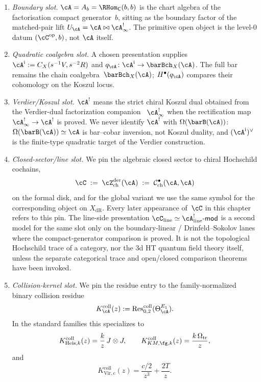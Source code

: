 \begin{enumerate}[label=\textup{(\arabic*)}]
\item \emph{Boundary slot.} $\cA=A_b=\RHom_{\mathsf C}(b,b)$ is the
 chart algebra of the factorisation compact generator~$b$, sitting as the boundary factor of
 the matched-pair lift $U_\cA = \cA\bowtie\cA^{!}_\infty$. The
 primitive open object is the level-$0$ datum
 $(\cC^{\mathrm{op}},b)$, not $\cA$ itself.
\item \emph{Quadratic coalgebra slot.}
 A chosen presentation supplies
 $\cA^{\mathrm i}:=C_X(s^{-1}V,s^{-2}R)$ and
 $q_\cA\colon\cA^{\mathrm i}\to\barBch_X(\cA)$.
 The full bar remains the chain coalgebra~$\barBch_X(\cA)$;
 $H^\bullet(q_\cA)$ compares their cohomology on the Koszul locus.
\item \emph{Verdier/Koszul slot.} $\cA^!$ means the strict chiral
 Koszul dual obtained from the Verdier-dual factorization companion
~$\cA^{!}_\infty$ when the rectification map
 $\cA^{!}_\infty \to \cA^!$ is proved. We never identify
 $\cA^!$ with $\Omega(\barB(\cA))$: $\Omega(\barB(\cA))\simeq \cA$ is
 bar--cobar inversion, not Koszul duality, and
 $(\cA^{\mathrm i})^\vee$ is the finite-type quadratic target of the Verdier
 construction.
\item \emph{Closed-sector/line slot.} We pin the algebraic closed sector to chiral
 Hochschild cochains,
 \[
 \cC \;:=\; \cZ^{\mathrm{der}}_{\mathrm{ch}}(\cA)
 \;:=\; \mathcal{C}^{\bullet}_{\mathrm{ch}}(\cA,\cA)
 \]
 on the formal disk, and for the global variant we use the same symbol
 for the corresponding object on $X_{\mathrm{dR}}$. Every later
 appearance of~$\cC$ in this chapter refers to this pin. The line-side
 presentation $\cC_{\mathrm{line}} \simeq
 \cA^!_{\mathrm{line}}\text{-}\mathsf{mod}$ is a second model for the
 same slot only on the boundary-linear / Drinfeld--Sokolov lanes where
 the compact-generator comparison is proved. It is not the
 topological Hochschild trace of a category, nor the $3$d HT quantum
 field theory itself, unless the separate categorical trace and
 open/closed comparison theorems have been invoked.
\item \emph{Collision-kernel slot.} We pin the residue entry to the
 family-normalized binary collision residue
 \[
 K_\cA^{\mathrm{coll}}(z)
 :=\operatorname{Res}^{\mathrm{coll}}_{0,2}(\Theta_\cA^{E_1}).
 \]
 In the standard families this specializes to
 \[
 K^{\mathrm{coll}}_{\mathrm{Heis},k}(z)=\frac{k}{z}\,J\otimes J,
 \qquad
 K^{\mathrm{coll}}_{KM,\fg,k}(z)=\frac{k\,\Omega_{\mathrm{tr}}}{z},
 \]
 and
 \[
 K^{\mathrm{coll}}_{\mathrm{Vir},c}(z)=\frac{c/2}{z^3}+\frac{2T}{z}.
\]
\end{enumerate}
